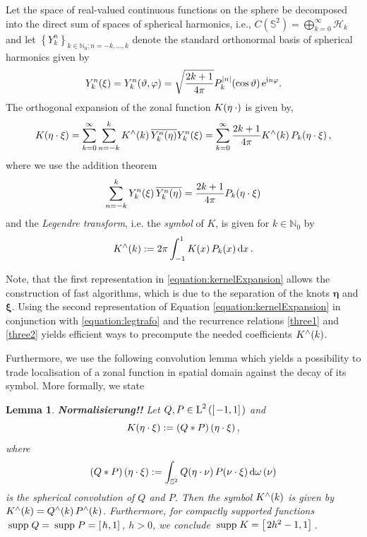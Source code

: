 \documentclass[11pt,a4paper,twoside,bibtotoc]{scrartcl}
\theoremstyle{plain}
\newtheorem{lemma}[theorem]{Lemma}
\theoremstyle{definition}
\theoremstyle{remark}
\newcommand{\supp}{\:{\rm supp}}
\newcommand{\NZ}{\ensuremath{\mathbb{N}_{0}}}
\newcommand{\set}[1]{\ensuremath{\left\{#1\right\rbrace}}
\newcommand{\twosphere}{\ensuremath{\mathbb{S}^2}}
\newcommand{\Ln}[2]{\ensuremath{\text{\rm{L}}^{#1}\left(#2\right)}}
\newcommand{\interv}[4]{\ensuremath{\left#1\left.#2,#3\right#4\right.}}
\newcommand{\fun}[2]{\ensuremath{#1{\hspace{-0.4ex}}\left(#2\right)}}
\newcommand{\mb}[1]{\mathbf{#1}}
\newcommand{\V}[1]{\mb{#1}}
\newcommand{\dx}{\text{\rm{d}}}
\newcommand{\e}{\mbox{\rm{e}}}
\newcommand{\im}{\mbox{\scriptsize\rm{i}}}
\numberwithin{equation}{section}
\numberwithin{table}{section}
\numberwithin{figure}{section}
\begin{document}
Let the space of real-valued continuous functions on the sphere be decomposed
into the direct sum of spaces of spherical harmonics, i.e.,
$C(\twosphere)=\bigoplus_{k=0}^{\infty} \mathcal{H}_k$ and let
$\set{Y_{k}^n}_{k \in \NZ; n=-k,\ldots,k}$ denote the 
standard orthonormal basis of spherical harmonics given by
\[
  \fun{Y_{k}^n}{\V{\xi}} = \fun{Y_{k}^n}{\vartheta,\varphi} = 
  \sqrt{\frac{2k+1}{4\pi}} 
  \fun{P_{k}^{|n|}}{\cos\vartheta} \e^{\im n \varphi}.
\]
The orthogonal expansion of the zonal function $\fun{K}{\V{\eta} \: \cdot}$
is given by,
\begin{equation}
  \label{equation:kernelExpansion}
  \fun{K}{\V{\eta} \cdot \V{\xi}} = \sum_{k = 0}^{\infty} \sum_{n=-k}^k
  \fun{K^{\wedge}}{k}\overline{\fun{Y_{k}^n}{\V{\eta}}} \fun{Y_{k}^n}{\V{\xi}}
  = \sum_{k = 0}^{\infty} \frac{2k+1}{4\pi} \fun{K^{\wedge}}{k}
  \fun{P_{k}}{\V{\eta} \cdot \V{\xi}},
\end{equation}
where we use the addition theorem
\[
\sum_{n=-k}^{k} \fun{Y_{k}^n}{\V{\xi}} \overline{\fun{Y_{k}^n}{\V{\eta}}} =
    \frac{2k+1}{4\pi}\fun{P_k}{\V{\eta} \cdot \V{\xi}}
\]
and the \emph{Legendre transform}, i.e. the \emph{symbol} of $K$, is given
for $k \in \NZ$ by
\begin{equation}
  \label{equation:legtrafo}
  \fun{K^{\wedge}}{k} := 2 \pi \int_{-1}^{1} \fun{K}{x} \fun{P_{k}}{x} \dx 
  x\,.
\end{equation}

Note, that the first representation in \eqref{equation:kernelExpansion} allows
the construction of fast algorithms, which is due to the separation of the
knots $\V{\eta}$ and $\V{\xi}$.
Using the second representation of Equation \eqref{equation:kernelExpansion} in
conjunction with \eqref{equation:legtrafo} and the recurrence relations
\eqref{three1} and \eqref{three2} yields efficient ways to precompute the
needed coefficients $\fun{K^{\wedge}}{k}$.

Furthermore, we use the following convolution lemma which yields a possibility to trade
localisation of a zonal function in spatial domain against the decay of its
symbol.
More formally, we state
\begin{lemma} {\bf Normalisierung!!}
  Let $Q,P\in \Ln{2}{\interv{[}{-1}{1}{]}}$ and
  \[
  \fun{K}{\V{\eta} \cdot \V{\xi}} := \fun{\left(Q * P\right)}{\V{\eta} \cdot
    \V{\xi}},
  \]
  where
  \[
    \fun{\left(Q * P\right)}{\V{\eta} \cdot \V{\xi}}:= 
    \int_{\twosphere} \fun{Q}{\V{\eta} \cdot \V{\nu}}
    \fun{P}{\V{\nu} \cdot \V{\xi}} \dx \omega\left(\nu\right)
  \]
  is the \emph{spherical convolution} of $Q$ and $P$. Then the symbol 
  $\fun{K^{\wedge}}{k}$ is given by 
  $\fun{K^{\wedge}}{k} = \fun{Q^{\wedge}}{k} \fun{P^{\wedge}}{k}$.
  Furthermore, for compactly supported functions $\supp\; Q = \supp\; P =
  \interv{[}{h}{1}{]}$, $h>0$, we conclude $\supp\; K =
  \interv{[}{2h^2-1}{1}{]}$.
\end{lemma}
\end{document}
